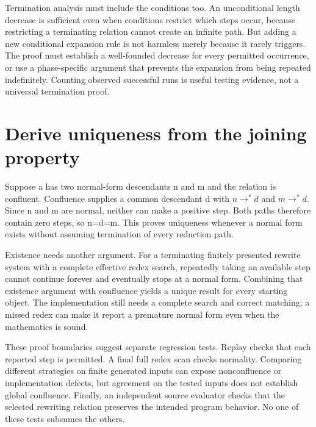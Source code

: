 Termination analysis must include the conditions too.
An unconditional length decrease is sufficient even when conditions restrict which steps occur, because restricting a terminating relation cannot create an infinite path.
But adding a new conditional expansion rule is not harmless merely because it rarely triggers.
The proof must establish a well-founded decrease for every permitted occurrence, or use a phase-specific argument that prevents the expansion from being repeated indefinitely.
Counting observed successful runs is useful testing evidence, not a universal termination proof.

\section{Derive uniqueness from the joining property}
\label{sec:ch81-uniqueness}
Suppose a has two normal-form descendants n and m and the relation is confluent.
Confluence supplies a common descendant d with $n\to^*d$ and $m\to^*d$.
Since n and m are normal, neither can make a positive step.
Both paths therefore contain zero steps, so n=d=m.
This proves uniqueness whenever a normal form exists without assuming termination of every reduction path.

Existence needs another argument.
For a terminating finitely presented rewrite system with a complete effective redex search, repeatedly taking an available step cannot continue forever and eventually stops at a normal form.
Combining that existence argument with confluence yields a unique result for every starting object.
The implementation still needs a complete search and correct matching; a missed redex can make it report a premature normal form even when the mathematics is sound.

These proof boundaries suggest separate regression tests.
Replay checks that each reported step is permitted.
A final full redex scan checks normality.
Comparing different strategies on finite generated inputs can expose nonconfluence or implementation defects, but agreement on the tested inputs does not establish global confluence.
Finally, an independent source evaluator checks that the selected rewriting relation preserves the intended program behavior.
No one of these tests subsumes the others.


